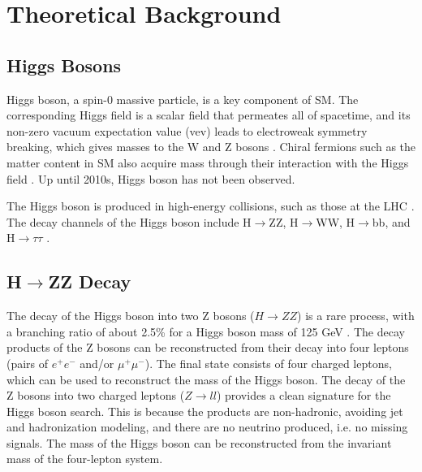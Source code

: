 \section{Theoretical Background}
\subsection{Higgs Bosons}
Higgs boson, a spin-0 massive particle, is a key component of SM. The corresponding Higgs field is a scalar field that permeates all of spacetime, and its non-zero vacuum expectation value (vev) leads to electroweak symmetry breaking, which gives masses to the W and Z bosons \cite{PeskinSchroeder1995, Weinberg1995}. Chiral fermions such as the matter content in SM also acquire mass through their interaction with the Higgs field \cite{PeskinSchroeder1995, Weinberg1995}. Up until 2010s, Higgs boson has not been observed. 

The Higgs boson is produced in high-energy collisions, such as those at the LHC \cite{CMS:2012qbp}. The decay channels of the Higgs boson include H$\rightarrow$ZZ, H$\rightarrow$WW, H$\rightarrow$bb, and H$\rightarrow$$\tau\tau$ \cite{Gunion:1990,PDG2023Higgs}. 

\subsection{H$\rightarrow$ZZ Decay}
The decay of the Higgs boson into two Z bosons ($H\to ZZ$) is a rare process, with a branching ratio of about 2.5\% for a Higgs boson mass of 125 GeV \cite{PDG2023Higgs}. The decay products of the Z bosons can be reconstructed from their decay into four leptons (pairs of $e^+e^-$ and/or $\mu^+\mu^-$). The final state consists of four charged leptons, which can be used to reconstruct the mass of the Higgs boson. The decay of the Z bosons into two charged leptons ($Z\rightarrow ll$) provides a clean signature for the Higgs boson search. This is because the products are non-hadronic, avoiding jet and hadronization modeling, and there are no neutrino produced, i.e. no missing signals. The mass of the Higgs boson can be reconstructed from the invariant mass of the four-lepton system. 

